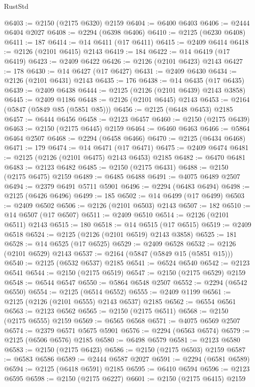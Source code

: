 \begin{lexlean}{RustStd}
\begin{coremodule}
@6403 := @2150 (@2175 @6320) @2159
@6404 := @6400 @6403
@6406 := @2444 @6404 @2027
@6408 := @2294 (@6398 @6406)
@6410 := @2125 (@6230 @6408)
@6411 := 187
@6414 := @14 @6411 (@17 @6411)
@6415 := @2409 @6414
@6418 := @2126 (@2101 @6415) @2143
@6419 := 184
@6422 := @14 @6419 (@17 @6419)
@6423 := @2409 @6422
@6426 := @2126 (@2101 @6423) @2143
@6427 := 178
@6430 := @14 @6427 (@17 @6427)
@6431 := @2409 @6430
@6434 := @2126 (@2101 @6431) @2143
@6435 := 176
@6438 := @14 @6435 (@17 @6435)
@6439 := @2409 @6438
@6444 := @2125 (@2126 (@2101 @6439) @2143 @3858)
@6445 := @2409 @1186
@6448 := @2126 (@2101 @6445) @2143
@6453 := @2164 (@5847 (@5849 @85 (@5851 @85)))
@6456 := @2125 (@6448 @6453) @2185
@6457 := @6444 @6456
@6458 := @2123 @6457
@6460 := @2150 (@2175 @6439)
@6463 := @2150 (@2175 @6445) @2159
@6464 := @6460 @6463
@6466 := @5864 @6464 @2507
@6468 := @2294 (@6458 @6466)
@6470 := @2125 (@6434 @6468)
@6471 := 179
@6474 := @14 @6471 (@17 @6471)
@6475 := @2409 @6474
@6481 := @2125 (@2126 (@2101 @6475) @2143 @6453) @2185
@6482 := @6470 @6481
@6483 := @2123 @6482
@6485 := @2150 (@2175 @6431)
@6488 := @2150 (@2175 @6475) @2159
@6489 := @6485 @6488
@6491 := @4075 @6489 @2507
@6494 := @2379 @6491 @5711 @5901
@6496 := @2294 (@6483 @6494)
@6498 := @2125 (@6426 @6496)
@6499 := 185
@6502 := @14 @6499 (@17 @6499)
@6503 := @2409 @6502
@6506 := @2126 (@2101 @6503) @2143
@6507 := 182
@6510 := @14 @6507 (@17 @6507)
@6511 := @2409 @6510
@6514 := @2126 (@2101 @6511) @2143
@6515 := 180
@6518 := @14 @6515 (@17 @6515)
@6519 := @2409 @6518
@6524 := @2125 (@2126 (@2101 @6519) @2143 @3858)
@6525 := 181
@6528 := @14 @6525 (@17 @6525)
@6529 := @2409 @6528
@6532 := @2126 (@2101 @6529) @2143
@6537 := @2164 (@5847 (@5849 @15 (@5851 @15)))
@6540 := @2125 (@6532 @6537) @2185
@6541 := @6524 @6540
@6542 := @2123 @6541
@6544 := @2150 (@2175 @6519)
@6547 := @2150 (@2175 @6529) @2159
@6548 := @6544 @6547
@6550 := @5864 @6548 @2507
@6552 := @2294 (@6542 @6550)
@6554 := @2125 (@6514 @6552)
@6555 := @2409 @1199
@6561 := @2125 (@2126 (@2101 @6555) @2143 @6537) @2185
@6562 := @6554 @6561
@6563 := @2123 @6562
@6565 := @2150 (@2175 @6511)
@6568 := @2150 (@2175 @6555) @2159
@6569 := @6565 @6568
@6571 := @4075 @6569 @2507
@6574 := @2379 @6571 @5675 @5901
@6576 := @2294 (@6563 @6574)
@6579 := @2125 (@6506 @6576) @2185
@6580 := @6498 @6579
@6581 := @2123 @6580
@6583 := @2150 (@2175 @6423)
@6586 := @2150 (@2175 @6503) @2159
@6587 := @6583 @6586
@6589 := @2444 @6587 @2027
@6591 := @2294 (@6581 @6589)
@6594 := @2125 (@6418 @6591) @2185
@6595 := @6410 @6594
@6596 := @2123 @6595
@6598 := @2150 (@2175 @6227)
@6601 := @2150 (@2175 @6415) @2159

\end{coremodule}
\end{lexlean}
